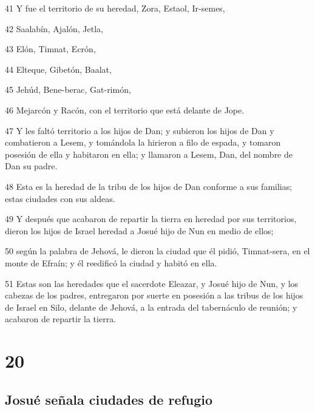 \par 41 Y fue el territorio de su heredad, Zora, Estaol, Ir-semes,
\par 42 Saalabín, Ajalón, Jetla,
\par 43 Elón, Timnat, Ecrón,
\par 44 Elteque, Gibetón, Baalat,
\par 45 Jehúd, Bene-berac, Gat-rimón,
\par 46 Mejarcón y Racón, con el territorio que está delante de Jope.
\par 47 Y les faltó territorio a los hijos de Dan; y subieron los hijos de Dan y combatieron a Lesem, y tomándola la hirieron a filo de espada, y tomaron posesión de ella y habitaron en ella; y llamaron a Lesem, Dan, del nombre de Dan su padre. 
\par 48 Esta es la heredad de la tribu de los hijos de Dan conforme a sus familias; estas ciudades con sus aldeas. 
\par 49 Y después que acabaron de repartir la tierra en heredad por sus territorios, dieron los hijos de Israel heredad a Josué hijo de Nun en medio de ellos;
\par 50 según la palabra de Jehová, le dieron la ciudad que él pidió, Timnat-sera, en el monte de Efraín; y él reedificó la ciudad y habitó en ella.
\par 51 Estas son las heredades que el sacerdote Eleazar, y Josué hijo de Nun, y los cabezas de los padres, entregaron por suerte en posesión a las tribus de los hijos de Israel en Silo, delante de Jehová, a la entrada del tabernáculo de reunión; y acabaron de repartir la tierra. 

\chapter{20}

\section*{Josué señala ciudades de refugio}

